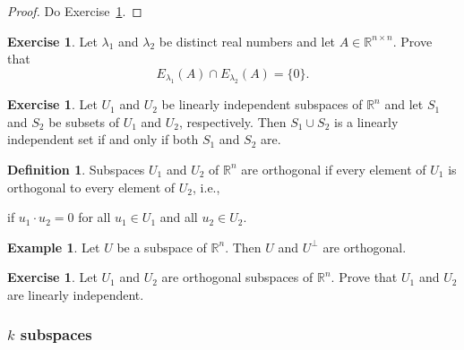 \documentclass[fullpage]{amsart}
\newcommand{\RR}{\mathbb{R}}
\theoremstyle{definition}
\newtheorem{definition}[theorem]{Definition}
\newtheorem{example}[theorem]{Example}
\newtheorem{exercise}[theorem]{Exercise}
\begin{document}
 \begin{proof}
  Do Exercise~\ref{exercise:distinct_eigenspaces_independent}.
 \end{proof}

 \begin{exercise}\label{exercise:distinct_eigenspaces_independent}
Let $\lambda_1$ and $\lambda_2$ be distinct real numbers and let $A\in\RR^{n\times n}$.
Prove that $$E_{\lambda_1}(A)\cap E_{\lambda_2}(A) = \{0\}.$$
 \end{exercise}

\begin{exercise}
  Let $U_1$ and $U_2$ be linearly independent subspaces of $\RR^n$ and let $S_1$ and $S_2$ be subsets of $U_1$ and $U_2$, respectively.
  Then $S_1\cup S_2$ is a linearly independent set if and only if both $S_1$ and $S_2$ are.
\end{exercise}

\begin{definition}
  Subspaces $U_1$ and $U_2$ of $\RR^n$ are orthogonal if every element of $U_1$ is orthogonal to every element of $U_2$, i.e.,
  \begin{center}
    if $u_1\cdot u_2=0$ for all $u_1\in U_1$ and all $u_2\in U_2$.
  \end{center}
\end{definition}

\begin{example}
  Let $U$ be a subspace of $\RR^n$. Then $U$ and $U^\perp$ are orthogonal.
\end{example}

\begin{exercise}
  Let $U_1$ and $U_2$ are orthogonal subspaces of $\RR^n$.
  Prove that $U_1$ and $U_2$ are linearly independent.
\end{exercise}


\subsubsection{$k$ subspaces}
\end{document}
